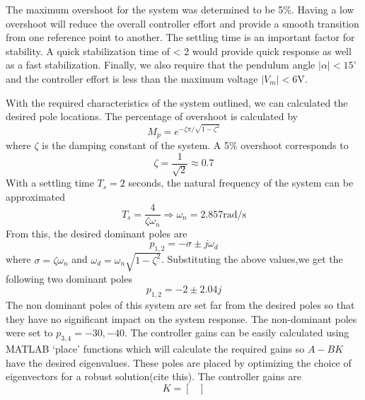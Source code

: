 \documentclass[superscriptaddress,floatfix,reprint,amssymb, amsmath,aps, pre]{revtex4-1}
\begin{document}
{{{            The maximum overshoot for the system was determined to be 5\%. Having a low overshoot will reduce the overall controller effort and provide a smooth transition from one reference point to another. The settling time is an important factor for stability. A quick stabilization time of < 2 would provide quick response as well as a fast stabilization. Finally, we also require that the pendulum angle \(|\alpha| < 15^\circ\) and the controller effort is less than the maximum voltage \(|V_m| < 6\)V.
        }
        
        With the required characteristics of the system outlined, we can calculated the desired pole locations. The percentage of overshoot is calculated by 
        \begin{equation}
            M_p = e^{-\zeta \pi / \sqrt{1-\zeta^{2}}}
        \end{equation}
        where \(\zeta\) is the damping constant of the system. A 5\% overshoot corresponds to 
        \begin{equation}
            \zeta = \frac{1}{\sqrt{2}} \approx 0.7 
        \end{equation}
        With a settling time \(T_s = 2\) seconds, the natural frequency of the system can be approximated 
        \begin{equation}
            T_s = \frac{4}{\zeta \omega_n} \Rightarrow \omega_n = 2.857 \text{rad/s}
        \end{equation}
        From this, the desired dominant poles are 
        \begin{equation}
            p_{1,2}=-\sigma \pm j \omega_{d}
        \end{equation}
        where \(\sigma = \zeta \omega_n\) and \(\omega_d = \omega_n \sqrt{1-\zeta^2}\). Substituting the above values,we get the following two dominant poles 
        \begin{equation}
            p_{1,2} = -2 \pm 2.04 j
        \end{equation}
        The non dominant poles of this system are set far from the desired poles so that they have no significant impact on the system response. The non-dominant poles were set to \(p_{3,4}=-30,-40\). The controller gains can be easily calculated using MATLAB `place' functions which will calculate the required gains so \(A-BK\) have the desired eigenvalues. These poles are placed by optimizing the choice of eigenvectors for a robust solution(cite this). The controller gains are 
        \begin{equation}
            K = \begin{bmatrix}

\end{bmatrix}
\end{equation}}}
\end{document}

